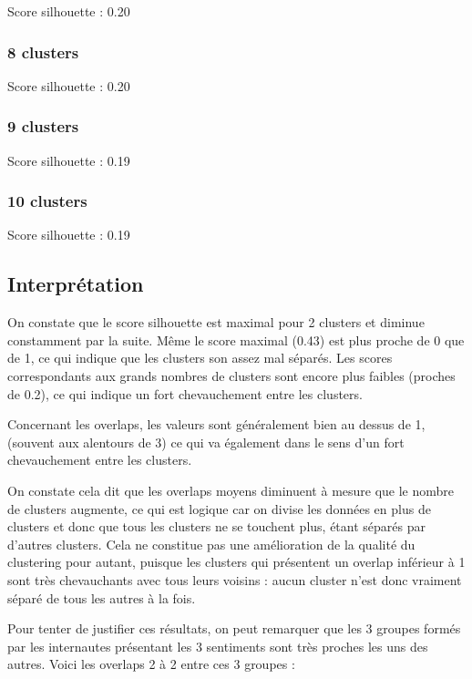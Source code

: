 \documentclass{article}
\begin{document}
\noindent Score silhouette : 0.20

\subsubsection*{8 clusters}

\noindent Score silhouette : 0.20

\subsubsection*{9 clusters}

\noindent Score silhouette : 0.19

\subsubsection*{10 clusters}

\noindent Score silhouette : 0.19

\subsection*{Interprétation}

On constate que le score silhouette est maximal pour 2 clusters et
diminue constamment par la suite. Même le score maximal (0.43) 
est plus proche de 0 que de 1, ce qui indique que les clusters son
assez mal séparés. Les scores correspondants aux grands nombres de clusters 
sont encore plus faibles (proches de 0.2), ce qui indique un fort 
chevauchement entre les clusters.

Concernant les overlaps, les valeurs sont généralement bien au dessus de 1,
(souvent aux alentours de 3) ce qui va également dans le sens d'un fort
chevauchement entre les clusters. 

On constate cela dit que les overlaps moyens
diminuent à mesure que le nombre de clusters augmente, ce qui est logique
car on divise les données en plus de clusters et donc que tous les clusters
ne se touchent plus, étant séparés par d'autres clusters. Cela ne 
constitue pas une amélioration de la qualité du clustering pour autant,
puisque les clusters qui présentent un overlap inférieur à 1 sont très 
chevauchants avec tous leurs voisins : aucun cluster n'est donc vraiment séparé
de tous les autres à la fois.

Pour tenter de justifier ces résultats, on peut remarquer que les
3 groupes formés par les internautes présentant les 3 sentiments sont
très proches les uns des autres. Voici les overlaps 2 à 2 entre ces
3 groupes :\\
\end{document}
